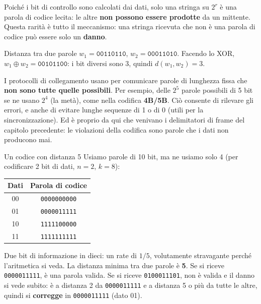 Poiché i bit di controllo sono calcolati dai dati, solo una stringa su $2^r$ è una parola di codice lecita: le altre \textbf{non possono
essere prodotte} da un mittente. Questa rarità è tutto il meccanismo: una stringa ricevuta che non è una parola di codice può essere
solo un \textbf{danno}.


\begin{esempio}{Distanza tra due parole}
$w_1 = \texttt{00110110}$, $w_2 = \texttt{00011010}$. Facendo lo XOR,
$w_1 \oplus w_2 = \texttt{00101100}$: i bit diversi sono 3, quindi $d(w_1, w_2) = 3$.
\end{esempio}

I protocolli di collegamento usano per comunicare parole di lunghezza fissa che \textbf{non sono tutte quelle possibili}. Per esempio,
delle $2^5$ parole possibili di 5 bit se ne usano $2^4$ (la metà), come nella codifica \textbf{4B/5B}. Ciò consente di rilevare gli
errori, e anche di evitare lunghe sequenze di 1 o di 0 (utili per la sincronizzazione). Ed è proprio da qui che venivano i
delimitatori di frame del capitolo precedente: le violazioni della codifica sono parole che i dati non producono mai.

\begin{esempio}{Un codice con distanza 5}
Usiamo parole di 10 bit, ma ne usiamo solo 4 (per codificare 2 bit di dati, $n=2$, $k=8$):
\begin{center}
\begin{tabular}{cc}
\toprule
\textbf{Dati} & \textbf{Parola di codice} \\
\midrule
00 & \texttt{0000000000} \\
01 & \texttt{0000011111} \\
10 & \texttt{1111100000} \\
11 & \texttt{1111111111} \\
\bottomrule
\end{tabular}
\end{center}
Due bit di informazione in dieci: un rate di $1/5$, volutamente stravagante perché l'aritmetica si veda. La distanza minima tra due
parole è \textbf{5}. Se si riceve \texttt{0000011111}, è una parola valida. Se si riceve
\texttt{0\textcolor{netred}{1}000111\textcolor{netred}{0}1}, non è valida e il danno si vede subito: è a distanza 2 da
\texttt{0000011111} e a distanza 5 o più da tutte le altre, quindi si \textbf{corregge} in \texttt{0000011111} (dato 01).
\end{esempio}

